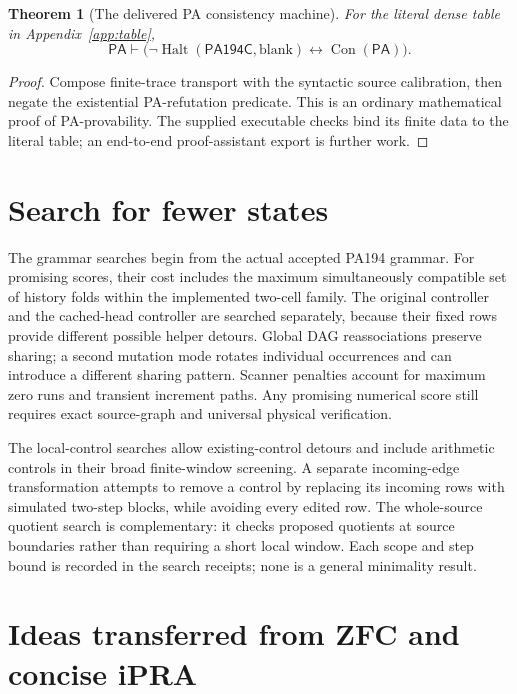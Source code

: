 \documentclass[11pt]{article}
\newtheorem{theorem}{Theorem}[section]
\newcommand{\PA}{\mathsf{PA}}
\newcommand{\Con}{\operatorname{Con}}
\newcommand{\Halt}{\operatorname{Halt}}
\newcommand{\M}{\mathsf{PA194C}}
\begin{document}
\begin{theorem}[The delivered PA consistency machine]
For the literal dense table in Appendix~\ref{app:table},
\[
\boxed{\PA\vdash\bigl(\neg\Halt(\M,\mathrm{blank})
           \leftrightarrow\Con(\PA)\bigr).}
\]
\end{theorem}
\begin{proof}
Compose finite-trace transport with the syntactic source calibration,
then negate the existential PA-refutation predicate. This is an ordinary
mathematical proof of PA-provability. The supplied executable checks bind
its finite data to the literal table; an end-to-end proof-assistant
export is further work.
\end{proof}

\section{Search for fewer states}\label{sec:search}



The grammar searches begin from the actual accepted PA194 grammar.
For promising scores, their cost includes the maximum simultaneously
compatible set of history folds within the implemented two-cell family. The original
controller and the cached-head controller are searched separately,
because their fixed rows provide different possible helper detours.
Global DAG reassociations preserve sharing; a second mutation mode
rotates individual occurrences and can introduce a different sharing
pattern. Scanner penalties account for maximum zero runs and transient
increment paths. Any promising numerical score still requires exact
source-graph and universal physical verification.

The local-control searches allow existing-control detours and include
arithmetic controls in their broad finite-window screening. A separate
incoming-edge transformation attempts to remove a control by replacing
its incoming rows with simulated two-step blocks, while avoiding every
edited row. The whole-source quotient search is complementary: it checks
proposed quotients at source boundaries rather than requiring a short
local window. Each scope and step bound is recorded in the search
receipts; none is a general minimality result.

\section{Ideas transferred from ZFC and concise iPRA}
\end{document}
